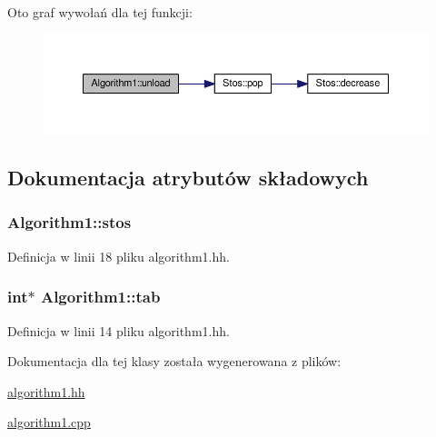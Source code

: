 Oto graf wywołań dla tej funkcji\-:\nopagebreak
\begin{figure}[H]
\begin{center}
\leavevmode
\includegraphics[width=350pt]{class_algorithm1_a135dd26c6c741812d75cd7f2f270592d_cgraph}
\end{center}
\end{figure}




\subsection{Dokumentacja atrybutów składowych}
\hypertarget{class_algorithm1_a3fb7f66d1e4aae77a49c6f7c241f47c9}{
\subsubsection[{stos}]{ Algorithm1\-::stos\hspace{0.3cm}{\ttfamily [private]}}}\label{class_algorithm1_a3fb7f66d1e4aae77a49c6f7c241f47c9}


Definicja w linii 18 pliku algorithm1.\-hh.

\hypertarget{class_algorithm1_a696e1e45bff4a0510dfb76274321583f}{
\subsubsection[{tab}]{\setlength{\rightskip}{0pt plus 5cm}int$\ast$ Algorithm1\-::tab\hspace{0.3cm}{\ttfamily [private]}}}\label{class_algorithm1_a696e1e45bff4a0510dfb76274321583f}


Definicja w linii 14 pliku algorithm1.\-hh.



Dokumentacja dla tej klasy została wygenerowana z plików\-:\begin{DoxyCompactItemize}
\item 
\hyperlink{algorithm1_8hh}{algorithm1.\-hh}\item 
\hyperlink{algorithm1_8cpp}{algorithm1.\-cpp}\end{DoxyCompactItemize}
